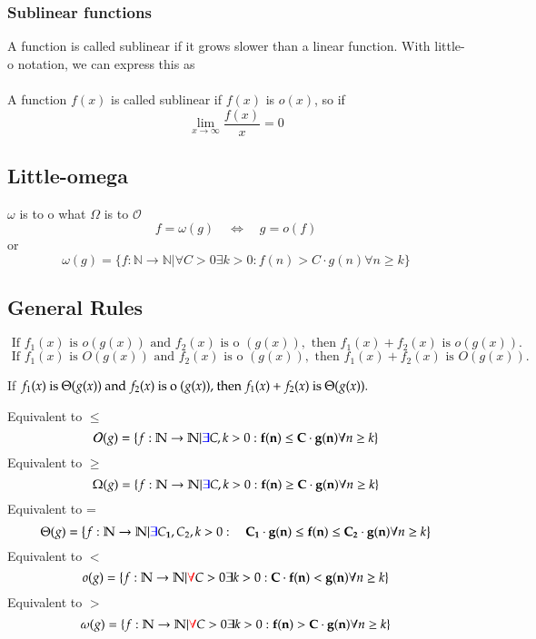 \documentclass{article}[18pt]
\begin{document}
\subsubsection{Sublinear functions}
A function is called sublinear if it grows slower than a linear function. With little-o notation, we can express this as\\
\\
A function $f(x)$ is called sublinear if $f(x)$ is $o(x)$, so if
\[
\lim _{x \rightarrow \infty} \frac{f(x)}{x}=0
\]
\subsection{Little-omega}
$\omega$ is to o what $\Omega$ is to $\mathcal{O}$
\[
f=\omega(g) \quad \Leftrightarrow \quad g=o(f)
\]
or
\[
\omega(g)=\{f : \mathbb{N} \rightarrow \mathbb{N} | \forall C>0 \exists k>0 : f(n)>C \cdot g(n) \forall n \geq k\}
\]
\subsection{General Rules}
$$ \text { If } f _ { 1 } ( x ) \text { is } o ( g ( x ) ) \text { and } f _ { 2 } ( x ) \text { is o } ( g ( x ) ) , \text { then } f _ { 1 } ( x ) + f _ { 2 } ( x ) \text { is }  { o ( g ( x ) ) . }$$
$$ { \text { If } f _ { 1 } ( x ) \text { is } O ( g ( x ) ) \text { and } f _ { 2 } ( x ) \text { is o } ( g ( x ) ) , \text { then } f _ { 1 } ( x ) + f _ { 2 } ( x ) \text { is } } { O ( g ( x ) ) . } $$
\begin{center}
	If $f _ { 1 } ( x ) \) is \( \Theta ( g ( x ) ) \) and \( f _ { 2 } ( x ) \) is o \( ( g ( x ) ) , \) then \( f _ { 1 } ( x ) + f _ { 2 } ( x ) \) is
	\( \Theta ( g ( x ) ) .$
\end{center}

Equivalent to $\leqslant$
$$\mathcal { O } ( g ) = \{ f : \mathbb{ N } \rightarrow \mathbb{ N } | \textcolor{blue}{\exists} C , k > 0 : \mathbf{f ( n ) \leq C \cdot g ( n )} \forall n \geq k \}$$
Equivalent to $\geqslant$
$$\Omega ( g ) = \{ f :  \mathbb{ N } \rightarrow \mathbb{ N } | \textcolor{blue}{\exists} C , k > 0 :\mathbf{ f ( n ) \geq C \cdot g ( n )} \forall n \geq k \}$$
Equivalent to =
$$\Theta ( g ) = \left\{ f : \mathbb{ N } \rightarrow \mathbb{ N } | \textcolor{blue}{\exists} C _ { \mathbf { 1 } } , C _ { 2 } , k > 0 : \mathbf{\quad C _ { \mathbf { 1 } } \cdot g ( n ) \leq f ( n ) \leq C _ { 2 } \cdot g ( n )} \forall n \geq k \right\}$$
Equivalent to $<$
$$o ( g ) = \{ f : \mathbb{ N } \rightarrow \mathbb{ N } | \textcolor{red}{\forall} C > 0 \exists k > 0 : \mathbf{C \cdot f ( n ) < g ( n )} \forall n \geq k \}$$
Equivalent to $>$
$$\omega ( g ) = \{ f : \mathbb{ N } \rightarrow \mathbb{ N } | \textcolor{red}{\forall} C > 0 \exists k > 0 : \mathbf{f ( n ) > C \cdot g ( n )} \forall n \geq k \}$$
\end{document}
